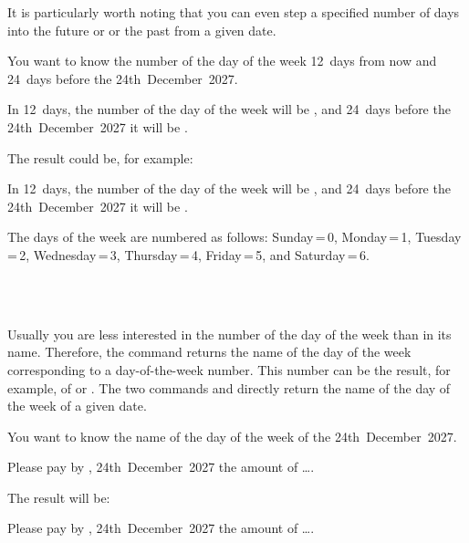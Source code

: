 It is particularly worth noting that you can even step a specified number of
days into the future or or the past from a given date.
\begin{Example}
  You want to know the number of the day of the week 12~days from now
  and 24~days before the 24th~December~2027.
\begin{lstcode}
  In 12~days, the number of the day of the week
  will be \the{}, and
  24~days before the 24th~December~2027 it will be
  \the{}.
\end{lstcode}
  The result could be, for example:
  \begin{ShowOutput}
    In 12~days, the number of the day of the week
    will be \the{}, and
    24~days before the 24th~December~2027 it will be
    \the{}.
  \end{ShowOutput}
\end{Example}

The days of the week are numbered as follows: Sunday\,=\,0, Monday\,=\,1,
Tuesday\,=\,2, Wednesday\,=\,3, Thursday\,=\,4, Friday\,=\,5, and
Saturday\,=\,6.%
%
\EndIndexGroup


\begin{Declaration}
  \\%
  \\%
\end{Declaration}%
Usually you are less interested in the
number of the day of the week than in its name. Therefore, the
 command returns the name of the day of the week
corresponding to a day-of-the-week number. This number can be the result, for
example, of  or . The two commands
 and  directly return the name of the day of
the week of a given date.

\begin{Example}
  You want to know the name of the day of the week of the 24th~December~2027.
\begin{lstcode}
  Please pay by ,
  24th~December~2027 the amount of \dots.
\end{lstcode}
  The result will be:
  \begin{ShowOutput}
    Please pay by ,
    24th~December~2027 the amount of \dots.
  \end{ShowOutput}
\end{Example}

